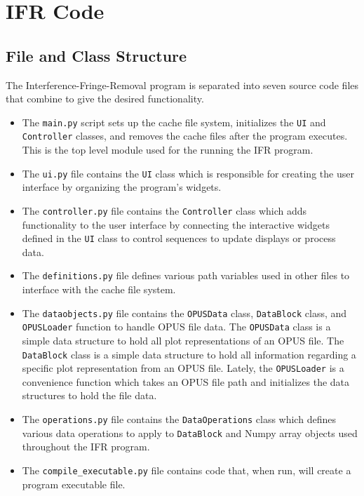 \documentclass[a4paper, 12pt]{report}
\begin{document}
    
    
    \chapter{IFR Code}
    
    \section{File and Class Structure}
    
    The Interference-Fringe-Removal program is separated into seven source code files that combine to give the desired functionality.
    
    \begin{itemize}
        \item The \verb|main.py| script sets up the cache file system, initializes the \verb|UI| and \verb|Controller| classes, and removes the cache files after the program executes. This is the top level module used for the running the IFR program.
        \item The \verb|ui.py| file contains the \verb|UI| class which is responsible for creating the user interface by organizing the program's widgets.
        \item The \verb|controller.py| file contains the \verb|Controller| class which adds functionality to the user interface by connecting the interactive widgets defined in the \verb|UI| class to control sequences to update displays or process data.
        \item The \verb|definitions.py| file defines various path variables used in other files to interface with the cache file system.
        \item The \verb|dataobjects.py| file contains the \verb|OPUSData| class, \verb|DataBlock| class, and \verb|OPUSLoader| function to handle OPUS file data. The \verb|OPUSData| class is a simple data structure to hold all plot representations of an OPUS file. The \verb|DataBlock| class is a simple data structure to hold all information regarding a specific plot representation from an OPUS file. Lately, the \verb|OPUSLoader| is a convenience function which takes an OPUS file path and initializes the data structures to hold the file data.
        \item The \verb|operations.py| file contains the \verb|DataOperations| class which defines various data operations to apply to \verb|DataBlock| and Numpy array objects used throughout the IFR program.
        \item The \verb|compile_executable.py| file contains code that, when run, will create a program executable file.
    \end{itemize}
    
\end{document}
